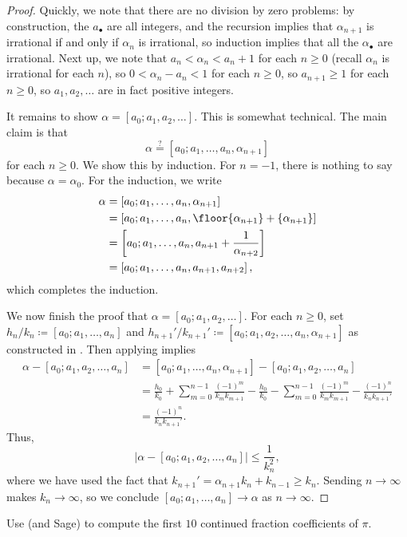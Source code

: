 \documentclass[../notes.tex]{subfiles}
\begin{document}
\begin{proof}
	Quickly, we note that there are no division by zero problems: by construction, the $a_\bullet$ are all integers, and the recursion implies that $\alpha_{n+1}$ is irrational if and only if $\alpha_n$ is irrational, so induction implies that all the $\alpha_\bullet$ are irrational. Next up, we note that $a_n<\alpha_n<a_n+1$ for each $n\ge0$ (recall $\alpha_n$ is irrational for each $n$), so $0<\alpha_n-a_n<1$ for each $n\ge0$, so $a_{n+1}\ge1$ for each $n\ge0$, so $a_1,a_2,\ldots$ are in fact positive integers.

	It remains to show $\alpha=[a_0;a_1,a_2,\ldots]$. This is somewhat technical. The main claim is that
	\[\alpha\stackrel?=[a_0;a_1,\ldots,a_n,\alpha_{n+1}]\]
	for each $n\ge0$. We show this by induction. For $n=-1$, there is nothing to say because $\alpha=\alpha_0$. For the induction, we write
	\begin{align*}
		\alpha &= [a_0;a_1,\ldots,a_n,\alpha_{n+1}] \\
		&= [a_0;a_1,\ldots,a_n,\floor{\alpha_{n+1}}+\{\alpha_{n+1}\}] \\
		&= \left[a_0;a_1,\ldots,a_n,a_{n+1}+\frac1{\alpha_{n+2}}\right] \\
		&= \left[a_0;a_1,\ldots,a_n,a_{n+1},a_{n+2}\right],
	\end{align*}
	which completes the induction.

	We now finish the proof that $\alpha=[a_0;a_1,a_2,\ldots]$. For each $n\ge0$, set $h_n/k_n\coloneqq[a_0;a_1,\ldots,a_n]$ and $h_{n+1}'/k_{n+1}'\coloneqq[a_0;a_1,a_2,\ldots,a_n,\alpha_{n+1}]$ as constructed in . Then applying  implies
	\begin{align*}
		\alpha-[a_0;a_1,a_2,\ldots,a_n] &= [a_0;a_1,\ldots,a_n,\alpha_{n+1}]-[a_0;a_1,a_2,\ldots,a_n] \\
		&= \frac{h_0}{k_0}+\sum_{m=0}^{n-1}\frac{(-1)^m}{k_mk_{m+1}}-\frac{h_0}{k_0}-\sum_{m=0}^{n-1}\frac{(-1)^m}{k_mk_{m+1}}-\frac{(-1)^n}{k_nk_{n+1}'} \\
		&= \frac{(-1)^n}{k_nk_{n+1}'}.
	\end{align*}
	Thus,
	\[\left|\alpha-[a_0;a_1,a_2,\ldots,a_n]\right|\le\frac1{k_n^2},\]
	where we have used the fact that $k_{n+1}'=\alpha_{n+1}k_n+k_{n-1}\ge k_n$. Sending $n\to\infty$ makes $k_n\to\infty$, so we conclude $[a_0;a_1,\ldots,a_n]\to\alpha$ as $n\to\infty$.
\end{proof}
\begin{exe}
	Use  (and Sage) to compute the first $10$ continued fraction coefficients of $\pi$.
\end{exe}
\end{document}
